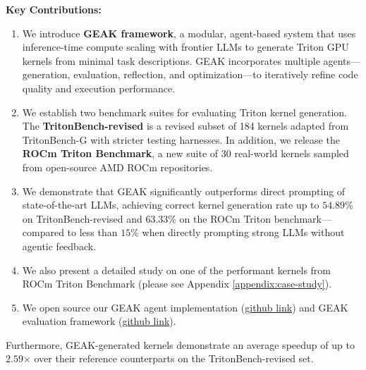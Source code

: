 \textbf{Key Contributions:}
\begin{enumerate}
    \item We introduce \textbf{GEAK framework}, a modular, agent-based system that uses inference-time compute scaling with frontier LLMs to generate Triton GPU kernels from minimal task descriptions. GEAK incorporates multiple agents—generation, evaluation, reflection, and optimization—to iteratively refine code quality and execution performance.
    \item We establish two benchmark suites for evaluating Triton kernel generation. The \textbf{TritonBench-revised} is a revised subset of 184 kernels adapted from TritonBench-G\cite{li2025tritonbenchbenchmarkinglargelanguage} with stricter testing harnesses. In addition, we release the \textbf{ROCm Triton Benchmark}, a new suite of 30 real-world kernels sampled from open-source AMD ROCm repositories.
    \item We demonstrate that GEAK significantly outperforms direct prompting of state-of-the-art LLMs, achieving correct kernel generation rate up to $54.89$\% on TritonBench-revised and $63.33$\% on the ROCm Triton benchmark—compared to less than $15$\% when directly prompting strong LLMs without agentic feedback.
    \item We also present a detailed study on one of the performant kernels from ROCm Triton Benchmark (please see Appendix \ref{appendix:case-study}).
    \item We open source our GEAK agent implementation (\href{https://github.com/AMD-AIG-AIMA/GEAK-agent}{github link}) and GEAK evaluation framework (\href{https://github.com/AMD-AIG-AIMA/GEAK-eval}{github link}).
\end{enumerate}

Furthermore, GEAK-generated kernels demonstrate an average speedup of up to $2.59$× over their reference counterparts on the TritonBench-revised set. 